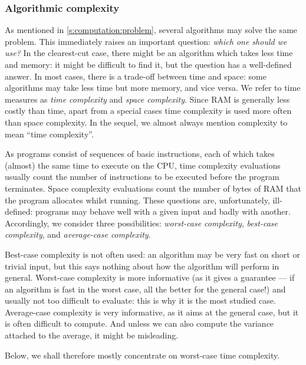 \documentclass[a4paper]{book}
\theoremstyle{changebreak}                %
\begin{document}
\subsubsection{Algorithmic complexity}
\label{s:computation:complexity}
As mentioned in \ref{s:computation:problem}, several
algorithms may solve the same problem.
This immediately raises an important question: {\it which one should
  we use?} In the clearest-cut case, there might be an algorithm which
takes less time and memory: it might be difficult to find it, but the
question has a well-defined answer. In most cases, there is a
trade-off between time and space: some algorithms may
take less time but more memory, and vice versa. We refer to time
measures as {\it time complexity} and {\it
  space complexity}. Since RAM is generally
less costly than time, apart from a special cases time complexity is
used more often than space complexity. In the sequel, we almost always
mention complexity to mean ``time complexity''.

As programs consist of sequences of basic instructions, each of which
takes (almost) the same time to execute on the CPU, time complexity
evaluations usually count the number of instructions to be executed
before the program terminates. Space complexity evaluations count the
number of bytes of RAM that the program allocates whilst running. These
questions are, unfortunately, ill-defined: programs may behave well
with a given input and badly with another. Accordingly, we consider
three possibilities: {\it worst-case
  complexity}, {\it best-case
  complexity}, and {\it average-case
  complexity}.

Best-case complexity is not often used: an algorithm may be very fast
on short or trivial input, but this says nothing about how the
algorithm will perform in general. Worst-case complexity is more
informative (as it gives a guarantee --- if an algorithm is fast in
the worst case, all the better for the general case!) and usually not
too difficult to evaluate: this is why it is the most studied
case. Average-case complexity is very informative, as it aims at the
general case, but it is often difficult to compute. And unless we can
also compute the variance attached to the average, it might be
misleading.

Below, we shall therefore mostly concentrate on worst-case time
complexity.
\end{document}
